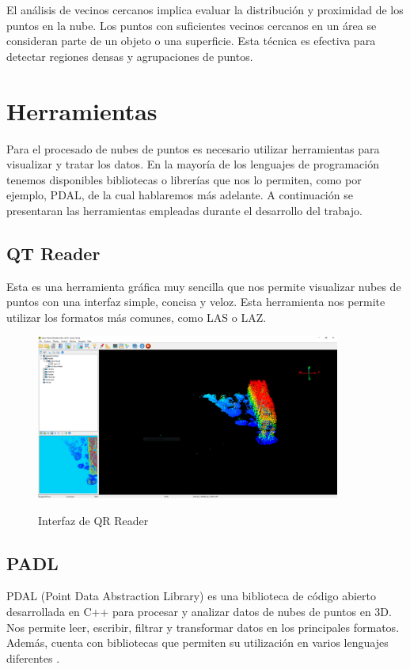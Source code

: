 El análisis de vecinos cercanos implica evaluar la distribución y proximidad de los puntos en la nube. Los puntos con suficientes vecinos cercanos en un área se consideran parte de un objeto o una superficie. Esta técnica es efectiva para detectar regiones densas y agrupaciones de puntos.


\section{Herramientas}
Para el procesado de nubes de puntos es necesario utilizar herramientas para visualizar y tratar los datos. En la mayoría de los lenguajes de programación tenemos disponibles bibliotecas o librerías que nos lo permiten, como por ejemplo, PDAL, de la cual hablaremos más adelante.
A continuación se presentaran las herramientas empleadas durante el desarrollo del trabajo.

\subsection{QT Reader}
Esta es una herramienta gráfica muy sencilla que nos permite visualizar nubes de puntos con una interfaz simple, concisa y veloz. Esta herramienta nos permite utilizar los formatos más comunes, como LAS o LAZ.

\begin{figure}[h]
\centering
\includegraphics[width=10cm]{imaxes/qtreaderventana.png}
\label{fig:pointnetc}
\caption{Interfaz de QR Reader}
\end{figure}

\subsection{PADL}

PDAL (Point Data Abstraction Library) es una biblioteca de código abierto desarrollada en C++ para procesar y analizar datos de nubes de puntos en 3D. Nos permite leer, escribir, filtrar y transformar datos en los principales formatos. Además, cuenta con bibliotecas que permiten su utilización en varios lenguajes diferentes \cite{pdal}.

